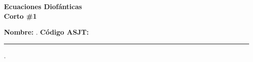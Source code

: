 \begin{center} \textbf
{
    \Large Ecuaciones Diofánticas \\ \vspace{2mm}Corto \#1
}
\end{center}

\vspace{8mm}

\textbf{Nombre:} \hrulefill.
\textbf{Código ASJT:} \rule{3cm}{0.1mm}.

\thispagestyle{first-page-style}